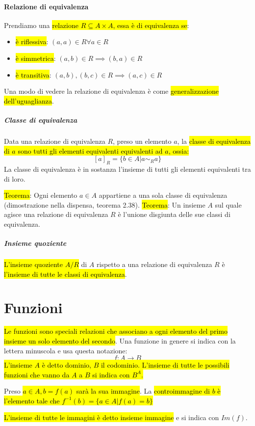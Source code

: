 \paragraph{Relazione di equivalenza} Prendiamo una \hl{relazione
$R \subseteq A \times A$, essa è di equivalenza se}:
\begin{itemize}
    \item \hl{è riflessiva}: $(a,a) \in R \forall a \in R$
    \item \hl{è simmetrica}: $(a,b) \in R \implies (b,a) \in R$
    \item \hl{è transitiva}: $(a,b), (b,c) \in R \implies (a,c) \in R$
\end{itemize}
Una modo di vedere la relazione di equivalenza è come \hl{generalizzazione
dell'uguaglianza}.

\subparagraph{Classe di equivalenza} Data una relazione di equivalenza $R$, preso
un elemento $a$, la \hl{classe di equivalenza di $a$ sono tutti gli elementi
equivalenti equivalenti ad $a$, ossia:}
    \[ {[a]}_R = \{ b \in A | a \sim_R a \} \]
La classe di equivalenza è in sostanza l'insieme di tutti gli elementi
equivalenti tra di loro.

\hl{Teorema}: Ogni elemento $a \in A$ appartiene a una sola classe di equivalenza
(dimostrazione nella dispensa, teorema 2.38).
\hl{Teorema}: Un insieme $A$ sul quale agisce una relazione di equivalenza $R$
è l'unione disgiunta delle sue classi di equivalenza.

\subparagraph{Insieme quoziente} \hl{L'insieme quoziente $A/R$} di $A$ rispetto
a una relazione di equivalenza $R$ è \hl{l'insieme di tutte le classi di
equivalenza}.

\section{Funzioni}
\hl{Le funzioni sono speciali relazioni che associano a ogni elemento del
primo insieme un solo elemento del secondo}. Una funzione in genere si indica
con la lettera minuscola e usa questa notazione: \[ f: A \to B \]
\hl{L'insieme $A$ è detto dominio, $B$ il codominio. L'insieme di tutte le
possibili funzioni che vanno da $A$ a $B$ si indica con $B^A$.}

Preso \hl{$a \in A, b = f(a)$ sarà la sua immagine}. La \hl{controimmagine
di $b$ è l'elemento tale che $f^{-1}(b) = \{ a \in A | f(a) = b \}$}

\hl{L'insieme di tutte le immagini è detto insieme immagine} e si indica con
$Im(f)$.

